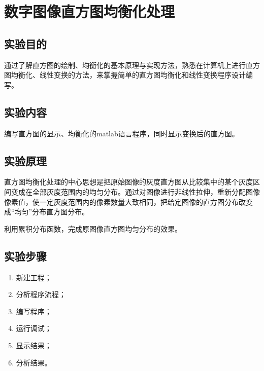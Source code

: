 \documentclass[12pt]{article}
\begin{document}
\section{数字图像直方图均衡化处理}
\setcounter{equation}{0}
\setcounter{table}{0}
\setcounter{figure}{0}
\subsection{实验目的}
通过了解直方图的绘制、均衡化的基本原理与实现方法，熟悉在计算机上进行直方图均衡化、线性变换的方法，来掌握简单的直方图均衡化和线性变换程序设计编写。
\subsection{实验内容}
编写直方图的显示、均衡化的matlab语言程序，同时显示变换后的直方图。
\subsection{实验原理}
直方图均衡化处理的中心思想是把原始图像的灰度直方图从比较集中的某个灰度区间变成在全部灰度范围内的均匀分布。通过对图像进行非线性拉伸，重新分配图像像素值，使一定灰度范围内的像素数量大致相同，把给定图像的直方图分布改变成“均匀”分布直方图分布。\par
利用累积分布函数，完成原图像直方图均匀分布的效果。
\subsection{实验步骤}
\begin{enumerate}
  \item 新建工程；
\item 分析程序流程；
\item 编写程序；
\item 运行调试；
\item 显示结果；
\item 分析结果。
\end{enumerate}
\end{document}
